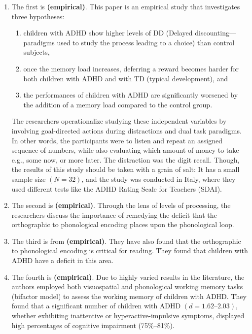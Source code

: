 \documentclass[stu]{apa7}
\begin{document}
\begin{enumerate}
	\item The first is \textcite{fabio_working_2020} \textbf{(empirical)}. This paper is an empirical study that investigates three hypotheses:
	\begin{enumerate}
		\item children with ADHD show higher levels of DD (Delayed discounting---paradigms used to study the process leading to a choice) than control subjects,
		\item once the memory load increases, deferring a reward becomes harder for both children with ADHD and with TD (typical development), and
		\item the performances of children with ADHD are significantly worsened by the addition of a memory load compared to the control group.
	\end{enumerate}
	The researchers operationalize studying these independent variables by involving goal-directed actions during distractions and dual task paradigms. In other words, the participants were to listen and repeat an assigned sequence of numbers, while also evaluating which amount of money to take---e.g., some now, or more later. The distraction was the digit recall. Though, the results of this study should be taken with a grain of salt: It has a small sample size \((N = 32)\), and the study was conducted in Italy, where they used different tests like the ADHD Rating Scale for Teachers (SDAI). 

	\item The second is \textcite{raiker_phonological_2019} \textbf{(empirical)}. Through the lens of levels of processing, the researchers discuss the importance of remedying the deficit that the orthographic to phonological encoding places upon the phonological loop. 

	\item The third is from \textcite{friedman_reading_2017} \textbf{(empirical)}. They have also found that the orthographic to phonological encoding is critical for reading. They found that children with ADHD have a deficit in this area.

	\item The fourth is \textcite{kofler_working_2020} \textbf{(empirical)}. Due to highly varied results in the literature, the authors employed both visuospatial and phonological working memory tasks (bifactor model) to assess the working memory of children with ADHD. They found that a significant number of children with ADHD \((d = 1.62 \text{--} 2.03)\), whether exhibiting inattentive or hyperactive-impulsive symptoms, displayed high percentages of cognitive impairment (75\%--81\%). 
\end{enumerate}
\end{document}
